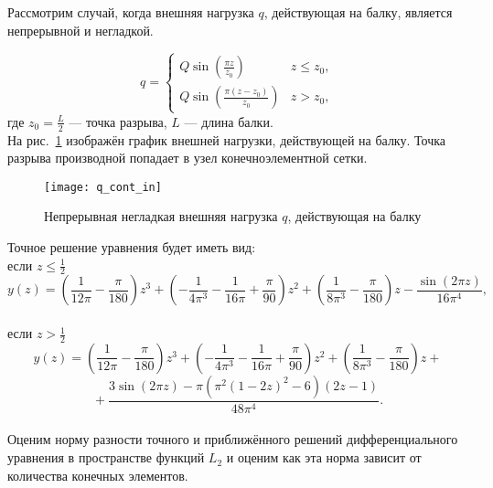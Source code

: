 \documentclass[12pt,a4paper]{article}
\begin{document}
Рассмотрим случай, когда внешняя нагрузка $q$, действующая на балку, является непрерывной и негладкой.
 
\[
q = 
 \begin{cases}
   Q \sin \left(\frac{\pi  z}{z_{0}}\right) & z \leq z_{0}, \\
   Q \sin \left(\frac{\pi  (z-z_{0})}{z_{0}}\right) & z > z_{0},
 \end{cases}
\]
где $z_{0}=\frac{L}{2}$ --- точка разрыва, $L$ --- длина балки. \\

На рис.~\ref{fig:q_cont_in} изображён график внешней нагрузки, действующей на балку. Точка разрыва производной попадает в узел конечноэлементной сетки.
	\begin{figure}[H]
		\centering
		\texttt{[image: q\_cont\_in]}
		\caption{Непрерывная негладкая внешняя нагрузка $q$, действующая на балку}
		\label{fig:q_cont_in}
	\end{figure}

%

Точное решение уравнения будет иметь вид:\\
если $z \leq \frac{1}{2}$\\
$$y(z)= \left(\frac{1}{12 \pi }-\frac{\pi }{180}\right) z^3+\left(-\frac{1}{4 \pi ^3}-\frac{1}{16 \pi }+\frac{\pi }{90}\right) z^2+\left(\frac{1}{8 \pi ^3}-\frac{\pi }{180}\right) z -\frac{\sin (2 \pi  z)}{16 \pi ^4},$$\\
если $z > \frac{1}{2}$\\
$$y(z)= \left(\frac{1}{12 \pi }-\frac{\pi }{180}\right) z^3+\left(-\frac{1}{4 \pi ^3}-\frac{1}{16 \pi }+\frac{\pi }{90}\right) z^2+\left(\frac{1}{8 \pi ^3}-\frac{\pi }{180}\right) z +{}$$
$${} + \frac{3 \sin (2 \pi  z)-\pi  \left(\pi ^2 (1-2 z)^2-6\right) (2 z-1)}{48 \pi ^4}.$$ \\


Оценим норму разности точного и приближённого решений дифференциального уравнения в пространстве функций $L_{2}$  и оценим как эта норма зависит от количества конечных элементов.\\
\end{document}
